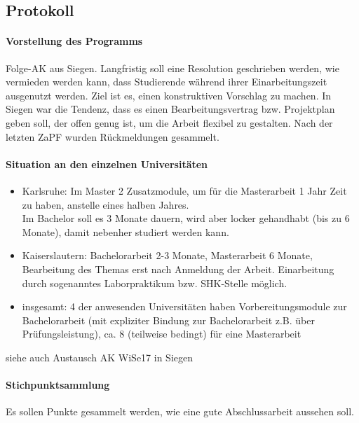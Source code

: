   \subsection*{Protokoll}
    \paragraph{Vorstellung des Programms}
      Folge-AK aus Siegen. Langfristig soll eine Resolution geschrieben werden, wie vermieden werden kann, dass Studierende während
      ihrer Einarbeitungszeit ausgenutzt werden. Ziel ist es, einen konstruktiven Vorschlag zu machen. In Siegen war die Tendenz,
      dass es einen Bearbeitungsvertrag bzw. Projektplan geben soll, der offen genug ist, um die Arbeit flexibel zu gestalten.
      Nach der letzten ZaPF wurden Rückmeldungen gesammelt.

    \paragraph{Situation an den einzelnen Universitäten}
      \begin{itemize}
        \item Karlsruhe: Im Master 2 Zusatzmodule, um für die Masterarbeit 1 Jahr Zeit zu haben, anstelle eines halben Jahres.\\ Im Bachelor soll es 3 Monate dauern, wird aber locker gehandhabt (bis zu 6 Monate), damit nebenher studiert werden kann.
        \item Kaiserslautern: Bachelorarbeit 2-3 Monate, Masterarbeit 6 Monate, Bearbeitung des Themas erst nach Anmeldung der Arbeit. Einarbeitung durch sogenanntes Laborpraktikum bzw. SHK-Stelle möglich.
        \item insgesamt: 4 der anwesenden Universitäten haben Vorbereitungsmodule zur Bachelorarbeit (mit expliziter Bindung zur Bachelorarbeit z.B. über Prüfungsleistung), ca. 8 (teilweise bedingt) für eine Masterarbeit
      \end{itemize}
      siehe auch Austausch AK WiSe17 in Siegen

    \paragraph{Stichpunktsammlung}
      Es sollen Punkte gesammelt werden, wie eine gute Abschlussarbeit aussehen soll. \\

